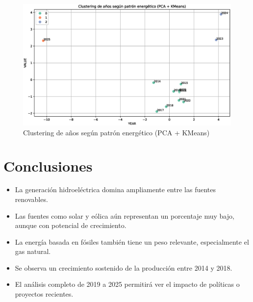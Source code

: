 \documentclass{article}
\begin{document}
\begin{figure}[t]
	\centering
	\includegraphics[width=0.9\linewidth]{fig_19}
	\caption{Clustering de años según patrón energético (PCA + KMeans)}
	\label{fig:fig19}
\end{figure}


\section{Conclusiones}

\begin{itemize}
	\item La generación hidroeléctrica domina ampliamente entre las fuentes renovables.
	\item Las fuentes como solar y eólica aún representan un porcentaje muy bajo, aunque con potencial de crecimiento.
	\item La energía basada en fósiles también tiene un peso relevante, especialmente el gas natural.
	\item Se observa un crecimiento sostenido de la producción entre 2014 y 2018.
	\item El análisis completo de 2019 a 2025 permitirá ver el impacto de políticas o proyectos recientes.
\end{itemize}





\end{document}
